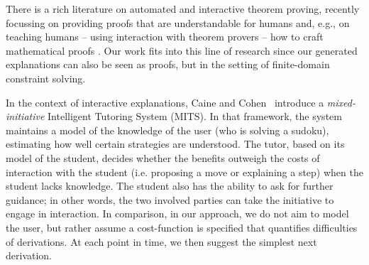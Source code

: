 

There is a rich literature on automated and interactive theorem proving, recently focussing on providing proofs that are understandable for humans \cite{Ganesalingam2017} and, e.g.,  on teaching humans -- using interaction with theorem provers -- how to craft mathematical proofs \cite{DBLP:conf/icml/YangD19}.
Our work fits into this line of research since our generated explanations can also be seen as proofs, but in the setting of finite-domain constraint solving. 

In the context of interactive explanations, Caine and Cohen~\cite{caine2006mits} introduce a \emph{mixed-initiative} Intelligent Tutoring System (MITS). 
In that framework, the system maintains a model of the knowledge of the user (who is solving a sudoku), estimating how well certain strategies are understood. 
The tutor, based on its model of the student, decides whether the benefits outweigh the costs of interaction with the student (i.e. proposing a move or explaining a step) when the student lacks knowledge. The student also has the ability to ask for further guidance; in other words, the two involved parties can take the initiative to engage in interaction. In comparison, in our approach, we do not aim to model the user, but rather assume a cost-function is specified that quantifies difficulties of derivations. At each point in time, we then suggest the simplest next derivation.


